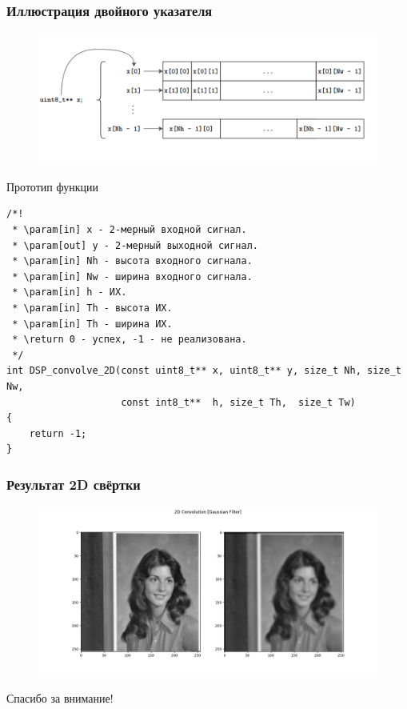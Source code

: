 \documentclass{beamer}
\begin{document}
    \begin{frame}
        \frametitle{Иллюстрация двойного указателя}
        \begin{figure}[!tbp]
           \centering
           \includegraphics[width=\textwidth]{pics/2Dptrs.png}
       \end{figure}
    \end{frame}
    \begin{frame}[fragile]{Прототип функции}
        \begin{verbatim}
/*!
 * \param[in] x - 2-мерный входной сигнал.
 * \param[out] y - 2-мерный выходной сигнал.
 * \param[in] Nh - высота входного сигнала.
 * \param[in] Nw - ширина входного сигнала.
 * \param[in] h - ИХ.
 * \param[in] Th - высота ИХ.
 * \param[in] Th - ширина ИХ.
 * \return 0 - успех, -1 - не реализована.
 */
int DSP_convolve_2D(const uint8_t** x, uint8_t** y, size_t Nh, size_t Nw, 
                    const int8_t**  h, size_t Th,  size_t Tw)
{
    return -1;
}
        \end{verbatim}
    \end{frame}
    \begin{frame}[fragile]
        \frametitle{Результат 2D свёртки}
        \begin{figure}[!tbp]
           \centering
           \includegraphics[width=\textwidth]{pics/result.png}
           \captionsetup{justification=centering}
       \end{figure}
    \end{frame}
    \begin{frame}
        \begin{center}
        \baselineskip 20.0mm
        \Huge Спасибо за внимание!
        \end{center}
    \end{frame}
\end{document}
